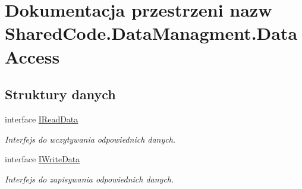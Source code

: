 \hypertarget{a00308}{}\section{Dokumentacja przestrzeni nazw Shared\+Code.\+Data\+Managment.\+Data\+Access}
\label{a00308}
\subsection*{Struktury danych}
\begin{DoxyCompactItemize}
\item 
interface \hyperlink{a00030}{I\+Read\+Data}
\begin{DoxyCompactList}\small\item\em Interfejs do wczytywania odpowiednich danych. \end{DoxyCompactList}\item 
interface \hyperlink{a00033}{I\+Write\+Data}
\begin{DoxyCompactList}\small\item\em Interfejs do zapisywania odpowiednich danych. \end{DoxyCompactList}\end{DoxyCompactItemize}
